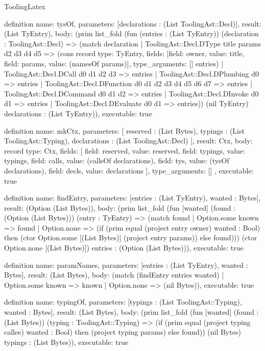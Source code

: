 \begin{lexlean}{ToolingLatex}
\begin{semanticmodule}
definition{
  name: tysOf,
  parameters: [declarations : (List ToolingAst::Decl)],
  result: (List TyEntry),
  body: (prim list_fold (fun (entries : (List TyEntry)) (declaration : ToolingAst::Decl) => (match declaration
    | ToolingAst::Decl.DType title params d2 d3 d4 d5 => (cons record{
      type: TyEntry,
      fields: [{field: owner, value: title}, {field: params, value: (namesOf params)}],
      type_arguments: []
    } entries)
    | ToolingAst::Decl.DCall d0 d1 d2 d3 => entries
    | ToolingAst::Decl.DPlumbing d0 => entries
    | ToolingAst::Decl.DFunction d0 d1 d2 d3 d4 d5 d6 d7 => entries
    | ToolingAst::Decl.DCommand d0 d1 d2 => entries
    | ToolingAst::Decl.DInvoke d0 d1 => entries
    | ToolingAst::Decl.DEvaluate d0 d1 => entries)) (nil TyEntry) declarations : (List TyEntry)),
  executable: true
}

definition{
  name: mkCtx,
  parameters: [
    reserved : (List Bytes),
    typings : (List ToolingAst::Typing),
    declarations : (List ToolingAst::Decl)
  ],
  result: Ctx,
  body: record{
    type: Ctx,
    fields: [
      {field: reserved, value: reserved},
      {field: typings, value: typings},
      {field: calls, value: (callsOf declarations)},
      {field: tys, value: (tysOf declarations)},
      {field: decls, value: declarations}
    ],
    type_arguments: []
  },
  executable: true
}

definition{
  name: findEntry,
  parameters: [entries : (List TyEntry), wanted : Bytes],
  result: (Option (List Bytes)),
  body: (prim list_fold (fun [wanted] (found : (Option (List Bytes))) (entry : TyEntry) => (match found
    | Option.some known => found
    | Option.none => (if (prim equal (project entry owner) wanted : Bool) then (ctor Option.some [(List Bytes)] (project entry params)) else found))) (ctor Option.none [(List Bytes)]) entries : (Option (List Bytes))),
  executable: true
}

definition{
  name: paramNames,
  parameters: [entries : (List TyEntry), wanted : Bytes],
  result: (List Bytes),
  body: (match (findEntry entries wanted)
    | Option.some known => known
    | Option.none => (nil Bytes)),
  executable: true
}

definition{
  name: typingOf,
  parameters: [typings : (List ToolingAst::Typing), wanted : Bytes],
  result: (List Bytes),
  body: (prim list_fold (fun [wanted] (found : (List Bytes)) (typing : ToolingAst::Typing) => (if (prim equal (project typing callee) wanted : Bool) then (project typing params) else found)) (nil Bytes) typings : (List Bytes)),
  executable: true
}


\end{semanticmodule}
\end{lexlean}
